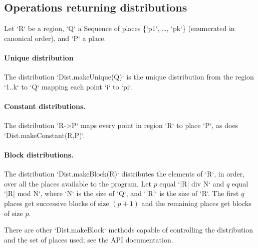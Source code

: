 \subsection{Operations returning distributions}

Let \xcd`R` be a region, \xcd`Q` a Sequence of places \{\xcd`p1`, \dots,
\xcd`pk`\} (enumerated in canonical order), and \xcd`P` a place.

\paragraph{Unique distribution} 
The distribution \xcd`Dist.makeUnique(Q)` is the unique distribution from the
region \xcd`1..k` to \xcd`Q` mapping each point \xcd`i` to \xcd`pi`.

\paragraph{Constant distributions.} 
The distribution \xcd`R->P` maps every point in region \xcd`R` to place \xcd`P`, as does
\xcd`Dist.makeConstant(R,P)`. 

\paragraph{Block distributions.}
The distribution \xcd`Dist.makeBlock(R)` distributes the elements of \xcd`R`,
in order, over all the places available to the program. 
Let $p$ equal \xcd`|R| div N` and $q$ equal \xcd`|R| mod N`,
where \xcd`N` is the size of \xcd`Q`, and 
\xcd`|R|` is the size of \xcd`R`.  The first $q$ places get
successive blocks of size $(p+1)$ and the remaining places get blocks of
size $p$.

There are other \xcd`Dist.makeBlock` methods capable of controlling the
distribution and the set of places used; see the API documentation.


